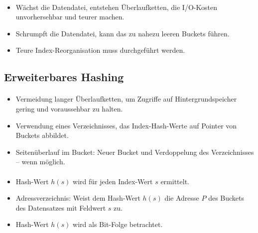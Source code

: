 \begin{frame}{\insertsection}
\framesubtitle{\insertsubsection}	
\begin{itemize}
\item W\"achst die Datendatei, entstehen \"Uberlaufketten, die I/O-Kosten unvorhersehbar und teurer machen.
\item Schrumpft die Datendatei, kann das zu nahezu leeren Buckets führen.
\item Teure Index-Reorganisation muss durchgef\"uhrt werden.	
\end{itemize}
\end{frame}

\subsection{Erweiterbares Hashing}

\begin{frame}{\insertsection}
\framesubtitle{\insertsubsection}	
\abs
{}
\begin{itemize}
	\item Vermeidung langer \"Uberlaufketten, um Zugriffe auf Hintergrundspeicher gering und voraussehbar zu halten.
\end{itemize}
\abs
{}
\begin{itemize}
	\item Verwendung eines Verzeichnisses, das Index-Hash-Werte auf Pointer von Buckets abbildet.
	\item Seitenüberlauf im Bucket: Neuer Bucket und Verdoppelung des Verzeichnisses -- wenn m\"oglich. 	
\end{itemize}
\end{frame}

\begin{frame}{\insertsection}
\framesubtitle{\insertsubsection}	
\begin{itemize}
	\item Hash-Wert $h(s)$ wird f\"ur jeden Index-Wert $s$ ermittelt.
	\item Adressverzeichnis: Weist dem Hash-Wert $h(s)$ die Adresse $P$ des Buckets des Datensatzes mit Feldwert $s$ zu.
	\item Hash-Wert $h(s)$ wird als Bit-Folge betrachtet.
\end{itemize}
\end{frame}

